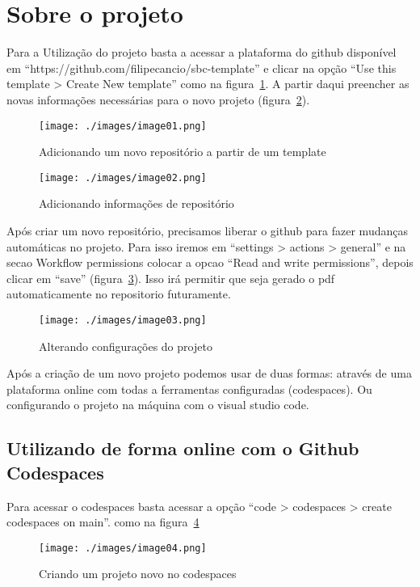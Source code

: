 \section{Sobre o projeto}

Para a Utilização do projeto basta a acessar a plataforma do github disponível em ``https://github.com/filipecancio/sbc-template'' e clicar na opção ``Use this template > Create New template'' como na figura~\ref{fig:image01}. A partir daqui preencher as novas informações necessárias para o novo projeto (figura~\ref{fig:image02}).

\begin{figure}[ht]
	\centering
	\texttt{[image: ./images/image01.png]}
	\caption{Adicionando um novo repositório a partir de um template}
	\label{fig:image01}
\end{figure}

\begin{figure}[ht]
	\centering
	\texttt{[image: ./images/image02.png]}
	\caption{Adicionando informações
		de repositório}
	\label{fig:image02}
\end{figure}
Após criar um novo repositório, precisamos liberar o github para fazer mudanças automáticas no projeto. Para isso iremos em  ``settings > actions > general'' e na secao Workflow permissions colocar a opcao ``Read and write permissions'', depois clicar em ``save'' (figura~\ref{fig:image03}). Isso irá permitir que seja gerado o pdf automaticamente no repositorio futuramente.

\begin{figure}[ht]
	\centering
	\texttt{[image: ./images/image03.png]}
	\caption{Alterando configurações do projeto}
	\label{fig:image03}
\end{figure}

Após a criação de um novo projeto podemos usar de duas formas: através de uma plataforma online com todas a ferramentas configuradas (codespaces). Ou configurando o projeto na máquina com o visual studio code.


\subsection{Utilizando de forma online com o Github Codespaces}

Para acessar o codespaces basta acessar a opção ``code > codespaces > create codespaces on main''. como na figura~\ref{fig:image04}

\begin{figure}[ht]
	\centering
	\texttt{[image: ./images/image04.png]}
	\caption{Criando um projeto novo no codespaces}
	\label{fig:image04}
\end{figure}


